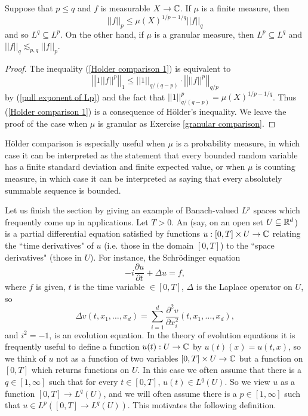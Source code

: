 \begin{corollary}
\label{Holder comparison}
Suppose that $p \leq q$ and $f$ is measurable $X \to \mathbb{C}$.
If $\mu$ is a finite measure, then
\begin{equation}
\label{Holder comparison 1}
||f||_p \leq \mu(X)^{1/p-1/q} ||f||_q
\end{equation}
and so $L^q \subseteq L^p$.
On the other hand, if $\mu$ is a granular measure, then $L^p \subseteq L^q$ and $||f||_q \lesssim_{p,q} ||f||_p$.
\end{corollary}
\begin{proof}
The inequality (\ref{Holder comparison 1}) is equivalent to
\[\left|\left|1 ||f||^p\right|\right|_1 \leq ||1||_{q/(q-p)} \cdot \left|\left| ||f||^p\right|\right|_{q/p}\]
by (\ref{pull exponent of Lp}) and the fact that $||1||_{q/(q-p)}^p = \mu(X)^{1/p-1/q}$.
Thus (\ref{Holder comparison 1}) is a consequence of H\"older's inequality.
We leave the proof of the case when $\mu$ is granular as Exercise \ref{granular comparison}.
\end{proof}

H\"older comparison is especially useful when $\mu$ is a probability measure, in which case it can be interpreted as the statement that every bounded random variable has a finite standard deviation and finite expected value, or when $\mu$ is counting measure, in which case it can be interpreted as saying that every absolutely summable sequence is bounded.

Let us finish the section by giving an example of Banach-valued $L^p$ spaces which frequently come up in applications.
Let $T > 0$. An  (say, on an open set $U \subseteq \mathbb{R}^d$) is a partial differential equation satisfied by functions $u: [0, T] \times U \to \mathbb{C}$ relating the ``time derivatives" of $u$ (i.e. those in the domain $[0, T]$) to the ``space derivatives" (those in $U$).
For instance, the Schr\"odinger equation
\[-i\frac{\partial u}{\partial t} + \Delta u = f,\]
where $f$ is given, $t$ is the time variable $\in [0, T]$, $\Delta$ is the Laplace operator on $U$, so
\[\Delta v(t, x_1, \dots, x_d) = \sum_{i=1}^d \frac{\partial^2 v}{\partial x_i^2} (t, x_1, \dots, x_d), \]
and $i^2 = -1$, is an evolution equation.
In the theory of evolution equations it is frequently useful to define a function $u(t): U \to \mathbb{C}$ by $u(t)(x) = u(t, x)$, so we think of $u$ not as a function of two variables $[0, T] \times U \to \mathbb{C}$ but a function on $[0, T]$ which returns functions on $U$.
In this case we often assume that there is a $q \in [1, \infty]$ such that for every $t \in [0, T]$, $u(t) \in L^q(U)$.
So we view $u$ as a function $[0, T] \to L^q(U)$, and we will often assume there is a $p \in [1, \infty]$ such that $u \in L^p([0, T] \to L^q(U))$.
This motivates the following definition.


